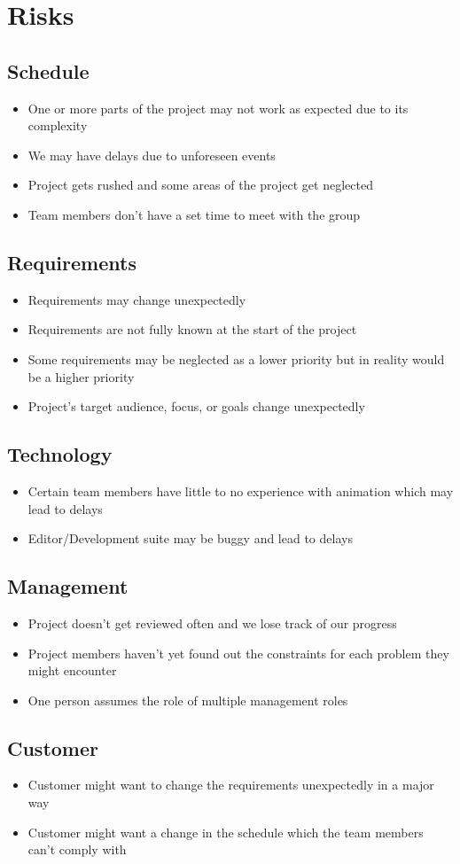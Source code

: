 \documentclass[12pt]{article}
\begin{document}
\section{Risks}
\label{sec:risks}
\subsection{Schedule}
\begin{itemize}
  \item One or more parts of the project may not work as expected due to its complexity
  \item We may have delays due to unforeseen events
  \item Project gets rushed and some areas of the project get neglected
  \item Team members don’t have a set time to meet with the group
\end{itemize}

\subsection{Requirements}
\begin{itemize}
  \item Requirements may change unexpectedly
  \item Requirements are not fully known at the start of the project
  \item Some requirements may be neglected as a lower priority but in reality would be a higher priority
  \item Project’s target audience, focus, or goals change unexpectedly
\end{itemize}

\subsection{Technology}
\begin{itemize}
  \item Certain team members have little to no experience with animation which may lead to delays
  \item Editor/Development suite may be buggy and lead to delays
\end{itemize}

\subsection{Management}
\begin{itemize}
  \item Project doesn’t get reviewed often and we lose track of our progress
  \item Project members haven’t yet found out the constraints for each problem they might encounter
  \item One person assumes the role of multiple management roles
\end{itemize}

\subsection{Customer}
\begin{itemize}
  \item Customer might want to change the requirements unexpectedly in a major way
  \item Customer might want a change in the schedule which the team members can’t comply with
\end{itemize}
\end{document}
